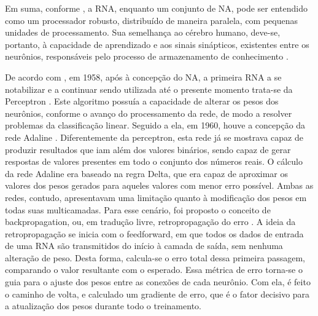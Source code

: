   Em suma, conforme , a RNA, enquanto um conjunto de NA, pode ser entendido como um processador robusto, distribuído de maneira paralela, com pequenas unidades de processamento. Sua semelhança ao cérebro humano, deve-se, portanto, à capacidade de aprendizado e aos sinais sinápticos, existentes entre os neurônios, responsáveis pelo processo de armazenamento de conhecimento \cite{haykin2001redes}.
	
  De acordo com , em 1958, após à concepção do NA, a primeira RNA a se notabilizar e a continuar sendo utilizada até o presente momento trata-se da Perceptron \cite{rosenblatt1958perceptron}. Este algoritmo possuía a capacidade de alterar os pesos dos neurônios, conforme o avanço do processamento da rede, de modo a resolver problemas da classificação linear. Seguido a ela, em 1960, houve a concepção da rede Adaline \cite{widrow1960adaptive}. Diferentemente da perceptron, esta rede já se mostrava capaz de produzir resultados que iam além dos valores binários, sendo capaz de gerar respostas de valores presentes em todo o conjunto dos números reais. O cálculo da rede Adaline era baseado na regra Delta, que era capaz de aproximar os valores dos pesos gerados para aqueles valores com menor erro possível. Ambas as redes, contudo, apresentavam uma limitação quanto à modificação dos pesos em todas suas multicamadas. Para esse cenário, foi proposto o conceito de backpropagation, ou, em tradução livre, retropropagação do erro \cite{rumelhart1986learning}. A ideia da retropropagação se inicia com o feedforward, em que todos os dados de entrada de uma RNA são transmitidos do início à camada de saída, sem nenhuma alteração de peso. Desta forma, calcula-se o erro total dessa primeira passagem, comparando o valor resultante com o esperado. Essa métrica de erro torna-se o guia para o ajuste dos pesos entre as conexões de cada neurônio. Com ela, é feito o caminho de volta, e calculado um gradiente de erro, que é o fator decisivo para a atualização dos pesos durante todo o treinamento.
  

